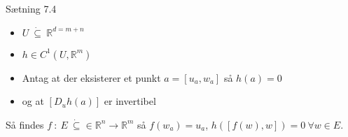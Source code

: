 \begin{boks}{Sætning 7.4}
  \begin{itemize}[label = $\ast$]
    \item $U \ \dot{\subseteq} \ \mathbb{R}^{d = m + n}$
    \item $h \in C^1(U, \mathbb{R}^m)$
    \item Antag at der eksisterer et punkt $a = [u_a, w_a]$ så $h(a) = 0$
    \item og at $[D_u h(a)]$ er invertibel
  \end{itemize}

  Så findes $f \ : \ E \ \dot{\subseteq} \in \mathbb{R}^n \rightarrow \mathbb{R}^m$ så $f(w_a) = u_a$, $h([f(w), w]) = 0 \ \forall w \in E$.
\end{boks}

